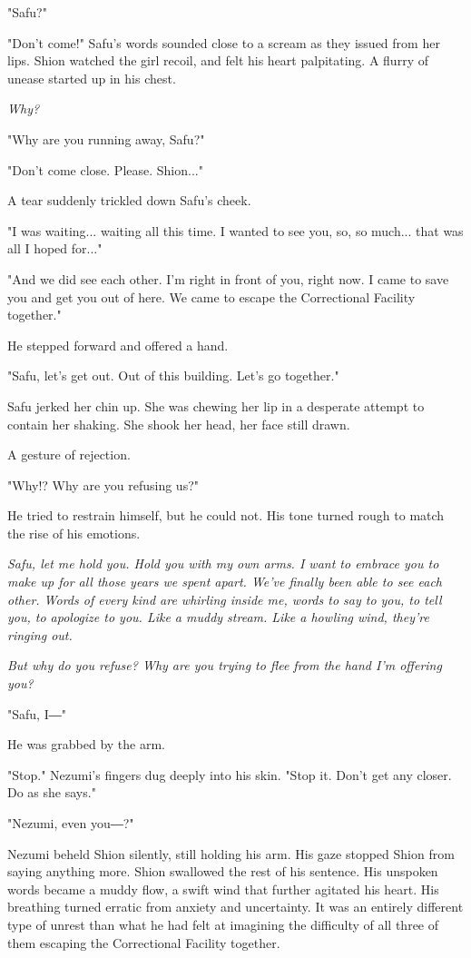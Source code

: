 "Safu?"

"Don't come!" Safu's words sounded close to a scream as they issued from
her lips. Shion watched the girl recoil, and felt his heart palpitating.
A flurry of unease started up in his chest.

\emph{Why?}

"Why are you running away, Safu?"

"Don't come close. Please. Shion..."

A tear suddenly trickled down Safu's cheek.

"I was waiting... waiting all this time. I wanted to see you, so, so
much... that was all I hoped for..."

"And we did see each other. I'm right in front of you, right now. I came
to save you and get you out of here. We came to escape the Correctional
Facility together."

He stepped forward and offered a hand.

"Safu, let's get out. Out of this building. Let's go together."

Safu jerked her chin up. She was chewing her lip in a desperate attempt
to contain her shaking. She shook her head, her face still drawn.

A gesture of rejection.

"Why!? Why are you refusing us?"

He tried to restrain himself, but he could not. His tone turned rough to
match the rise of his emotions.

\emph{Safu, let me hold you. Hold you with my own arms. I want to embrace you
	to make up for all those years we spent apart. We've finally been able
	to see each other. Words of every kind are whirling inside me, words to
	say to you, to tell you, to apologize to you. Like a muddy stream. Like
	a howling wind, they're ringing out.}

\emph{But why do you refuse? Why are you trying to flee from the hand I'm
	offering you?}

"Safu, I―"

He was grabbed by the arm.

"Stop." Nezumi's fingers dug deeply into his skin. "Stop it. Don't get
any closer. Do as she says."

"Nezumi, even you―?"

Nezumi beheld Shion silently, still holding his arm. His gaze stopped
Shion from saying anything more. Shion swallowed the rest of his
sentence. His unspoken words became a muddy flow, a swift wind that
further agitated his heart. His breathing turned erratic from anxiety
and uncertainty. It was an entirely different type of unrest than what
he had felt at imagining the difficulty of all three of them escaping
the Correctional Facility together.

